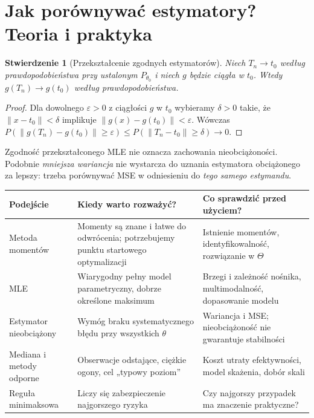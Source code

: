 \documentclass[11pt,a4paper,oneside]{report}
\numberwithin{equation}{chapter}
\theoremstyle{plain}
\newtheorem{stwierdzenie}[twierdzenie]{Stwierdzenie}
\theoremstyle{definition}
\theoremstyle{remark}
\begin{document}
\section{Jak porównywać estymatory? Teoria i praktyka}
\begin{stwierdzenie}[Przekształcenie zgodnych estymatorów]
\label{prop:continuous-estimator}
Niech $T_n\to t_0$ według prawdopodobieństwa przy ustalonym
$P_{\theta_0}$ i niech $g$ będzie ciągła w $t_0$. Wtedy
$g(T_n)\to g(t_0)$ według prawdopodobieństwa.
\end{stwierdzenie}
\begin{proof}
Dla dowolnego $\varepsilon>0$ z ciągłości $g$ w $t_0$
wybieramy $\delta>0$ takie, że $\|x-t_0\|<\delta$
implikuje $\|g(x)-g(t_0)\|<\varepsilon$.
Wówczas
$P(\|g(T_n)-g(t_0)\|\ge\varepsilon)
\le P(\|T_n-t_0\|\ge\delta)\to0$.
\end{proof}

Zgodność przekształconego MLE nie oznacza zachowania
nieobciążoności. Podobnie \emph{mniejsza wariancja} nie wystarcza
do uznania estymatora obciążonego za lepszy: trzeba porównywać MSE
w odniesieniu do \emph{tego samego estymandu}.

\begin{center}\small
\begin{tabular}{>{\raggedright\arraybackslash}p{}>{\raggedright\arraybackslash}p{}>{\raggedright\arraybackslash}p{}}
\toprule
\textbf{Podejście} & \textbf{Kiedy warto rozważyć?} & \textbf{Co sprawdzić przed użyciem?}\\
\midrule
Metoda momentów & Momenty są znane i łatwe do odwrócenia; potrzebujemy punktu startowego optymalizacji & Istnienie momentów, identyfikowalność, rozwiązanie w $\Theta$\\
MLE & Wiarygodny pełny model parametryczny, dobrze określone maksimum & Brzegi i zależność nośnika, multimodalność, dopasowanie modelu\\
Estymator nieobciążony & Wymóg braku systematycznego błędu przy wszystkich $\theta$ & Wariancja i MSE; nieobciążoność nie gwarantuje stabilności\\
Mediana i metody odporne & Obserwacje odstające, ciężkie ogony, cel „typowy poziom” & Koszt utraty efektywności, model skażenia, dobór skali\\
Reguła minimaksowa & Liczy się zabezpieczenie najgorszego ryzyka & Czy najgorszy przypadek ma znaczenie praktyczne?\\
\bottomrule
\end{tabular}
\end{center}
\end{document}
